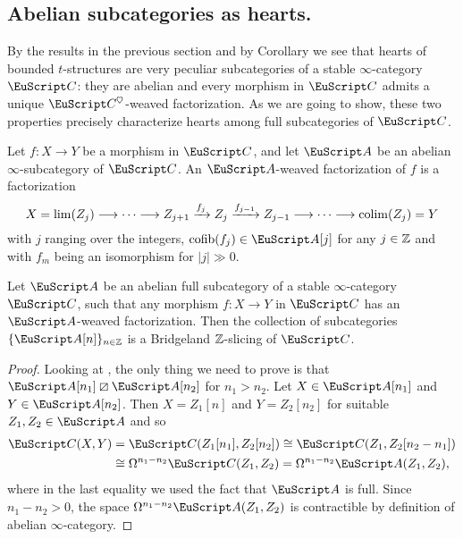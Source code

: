 \subsection{Abelian subcategories as hearts.}
By the results in the previous section and by Corollary  we see that hearts of bounded $t$-structures are very peculiar subcategories of a stable $\infty$-category $\C$: they are abelian and every morphism in $\C$ admits a unique $\C^\heart$-weaved factorization. As we are going to show, these two properties precisely characterize hearts among full subcategories of $\C$.
\begin{definition}
Let $f\colon X\to Y$ be a morphism in $\C$, and let $\cA$ be an abelian $\infty$-subcategory of $\C$. An $\cA$-weaved factorization of $f$ is a factorization
\[
X=\lim(Z_j) \longrightarrow\cdots \longrightarrow Z_{j+1} \xrightarrow{f_{j}} Z_{j} \xrightarrow{f_{j-1}}Z_{j-1}\longrightarrow \cdots\longrightarrow \mathrm{colim}(Z_j)=Y
\]
with $j$ ranging over the integers, $\cofib(f_j)\in \cA[j]$ for any $j\in \mathbb{Z} $ and with $f_m$ being an isomorphism for $|j|\gg 0$.
\end{definition}
\begin{proposition}
Let $\cA$ be an abelian full subcategory of a stable $\infty$-category $\C$, such that any morphism $f\colon X\to Y$  in $\C$ has an $\cA$-weaved factorization. Then the collection of subcategories $\{\cA[n]\}_{n\in \Z}$ is a Bridgeland $\mathbb{Z}$-slicing of $\C$.
\end{proposition}
\begin{proof} Looking at \adef{}, the only thing we need to prove is that $\cA[n_1]\orth\cA[n_2]$ for $n_1>n_2$. Let $X\in \cA[n_1]$ and $Y\in\cA[n_2]$. Then $X=Z_1[n]$ and $Y=Z_2[n_2]$ for suitable $Z_1,Z_2\in \cA$ and so 
\begin{align*}
\C(X,Y)&=\C(Z_1[n_1],Z_2[n_2])\cong  \C(Z_1,Z_2[n_2-n_1])\\
&\cong \Omega^{n_1-n_2}\C(Z_1,Z_2)=\Omega^{n_1-n_2}\cA(Z_1,Z_2),
\end{align*}
where in the last equality we used the fact that $\cA$ is full. Since $n_1-n_2>0$, the space $\Omega^{n_1-n_2}\cA(Z_1,Z_2)$ is contractible by definition of abelian $\infty$-category.
\end{proof}


